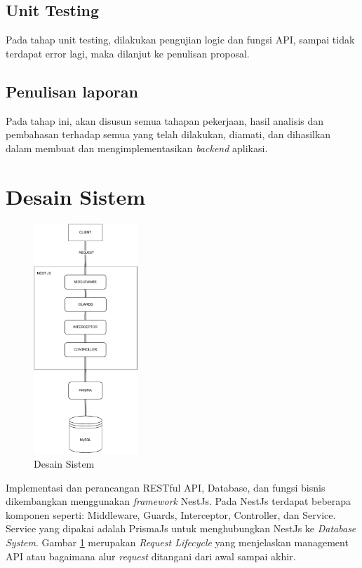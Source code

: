 \subsection{Unit Testing}
Pada tahap unit testing, dilakukan pengujian logic dan fungsi API, sampai tidak terdapat error lagi, maka dilanjut ke penulisan proposal.

\subsection{Penulisan laporan}
Pada tahap ini, akan disusun semua tahapan pekerjaan, hasil analisis dan pembahasan terhadap semua yang telah dilakukan, diamati, dan dihasilkan dalam membuat dan mengimplementasikan \textit{backend} aplikasi.

\section{Desain Sistem}
\begin{figure}[h]
	\centering
	\includegraphics[width=0.35\textwidth]{drawio/sistem-desain.drawio.pdf}
	\caption{Desain Sistem}
	\label{sistem-desain}
\end{figure}
Implementasi dan perancangan RESTful API, Database, dan fungsi bisnis dikembangkan menggunakan \textit{framework} NestJs. Pada NestJs terdapat beberapa komponen seperti: Middleware, Guards, Interceptor, Controller, dan Service. Service yang dipakai adalah PrismaJs untuk menghubungkan NestJs ke \textit{Database System}. Gambar \ref{sistem-desain} merupakan \textit{Request Lifecycle} yang menjelaskan management API atau bagaimana alur \textit{request} ditangani dari awal sampai akhir.


